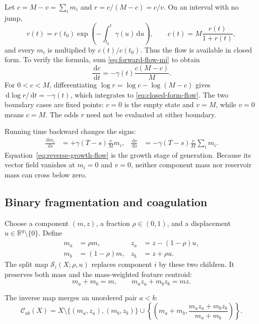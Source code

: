\documentclass[10pt]{article}
\theoremstyle{definition}
\theoremstyle{remark}
\newcommand{\R}{\mathbb{R}}
\newcommand{\dd}{\,\mathrm{d}}
\newcommand{\splitmap}{\mathcal{S}}
\newcommand{\mergemap}{\mathcal{C}}
\begin{document}
Let $c=M-v=\sum_i m_i$ and $r=c/(M-c)=c/v$.  On an interval with no jump,
\begin{equation}
  r(t)=r(t_0)\exp\!\left(-\int_{t_0}^{t}\gamma(u)\dd u\right),
  \qquad
  c(t)=M\frac{r(t)}{1+r(t)},
  \label{eq:closed-form-flow}
\end{equation}
and every $m_i$ is multiplied by $c(t)/c(t_0)$.  Thus the flow is available in closed form.
To verify the formula, sum \eqref{eq:forward-flow-mi} to obtain
\begin{equation}
  \frac{\dd c}{\dd t}=-\gamma(t)\frac{c(M-c)}{M}.
\end{equation}
For $0<c<M$, differentiating
$\log r=\log c-\log(M-c)$ gives
$\dd\log r/\dd t=-\gamma(t)$, which integrates to
\eqref{eq:closed-form-flow}.  The two boundary cases are fixed points:
$c=0$ is the empty state and $v=M$, while $v=0$ means $c=M$.  The odds
$r$ need not be evaluated at either boundary.

Running time backward changes the signs:
\begin{align}
  \frac{\dd m_i}{\dd s}
  &=+\gamma(T-s)\frac{v}{M}m_i,
  &
  \frac{\dd v}{\dd s}
  &=-\gamma(T-s)\frac{v}{M}\sum_i m_i.
  \label{eq:reverse-growth-flow}
\end{align}
Equation~\eqref{eq:reverse-growth-flow} is the growth stage of generation.  Because its vector field vanishes at $m_i=0$ and $v=0$, neither component mass nor reservoir mass can cross below zero.

\subsection{Binary fragmentation and coagulation}

Choose a component $(m,z)$, a fraction $\rho\in(0,1)$, and a displacement $u\in\R^q\setminus\{0\}$.  Define
\begin{align}
  m_a&=\rho m,
  &z_a&=z-(1-\rho)u,
  \label{eq:split-a}\\
  m_b&=(1-\rho)m,
  &z_b&=z+\rho u.
  \label{eq:split-b}
\end{align}
The split map $\splitmap_i(X;\rho,u)$ replaces component $i$ by these two children.  It preserves both mass and the mass-weighted feature centroid:
\begin{equation}
  m_a+m_b=m,
  \qquad
  m_a z_a+m_b z_b=mz.
  \label{eq:centroid-conservation}
\end{equation}

The inverse map merges an unordered pair $a<b$:
\begin{equation}
  \mergemap_{ab}(X)
  =X\setminus\{(m_a,z_a),(m_b,z_b)\}
   \cup\left\{\left(m_a+m_b,
   \frac{m_a z_a+m_b z_b}{m_a+m_b}\right)\right\}.
  \label{eq:merge-map}
\end{equation}
\end{document}
